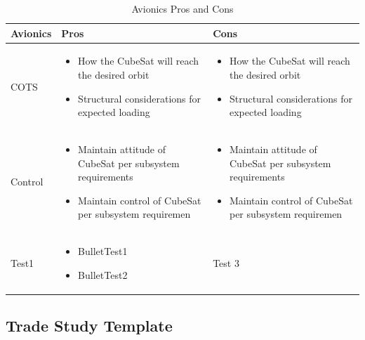 \documentclass[3p]{elsarticle}
\begin{document}
\begin{table}[H]
\centering
\begin{tabular}{|p{}|p{}|p{}|} 
\hline
\textbf{Avionics} & \textbf{Pros} & \textbf{Cons}
\\
\hline
     COTS
     &
    \begin{itemize}
        \item How the CubeSat will reach the desired orbit
        \item Structural considerations for expected loading
    \end{itemize}
    &
    \begin{itemize}
        \item How the CubeSat will reach the desired orbit
        \item Structural considerations for expected loading
    \end{itemize}
    \\
\hline
     Control
     &
    \begin{itemize}
        \item Maintain attitude of CubeSat per subsystem requirements
        \item Maintain control of CubeSat per subsystem requiremen
    \end{itemize}
    &
        \begin{itemize}
        \item Maintain attitude of CubeSat per subsystem requirements
        \item Maintain control of CubeSat per subsystem requiremen
    \end{itemize}
    \\
\hline
    Test1
    &
    \begin{itemize}
        \item BulletTest1
        \item BulletTest2
    \end{itemize}
    &
    Test 3
    \\
\hline
\end{tabular}
\caption{Avionics Pros and Cons \cite{einstein}}
\label{tbl:avionicsprocon}
\end{table}

\subsection{Trade Study Template}
\end{document}
